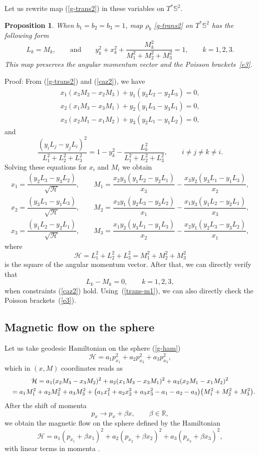 \documentclass[pdftex]{sigma}
\numberwithin{equation}{section}
\newtheorem{Proposition}[Theorem]{Proposition}
 { \theoremstyle{definition}
\newtheorem{Definition}[Theorem]{Definition}
\newtheorem{Note}[Theorem]{Note}
\newtheorem{Example}[Theorem]{Example}
\newtheorem{Remark}[Theorem]{Remark} }
\begin{document}
Let us rewrite map (\ref{g-trans2}) in these variables on $T^*\mathbb S^2$.
\begin{Proposition}
When $b_1=b_2=b_3=1$, map $\rho_b$ \eqref{g-trans2} on $T^*\mathbb S^2$ has the following form
\begin{equation}\label{e3-rho}
 L_k=M_k ,\qquad\mbox{and}\qquad y_k^2+x_k^2+\frac{M_k^2}{M_1^2+M_2^2+M_3^2}=1 ,\qquad k=1,2,3.
 \end{equation}
This map preserves the angular momentum vector and the Poisson brackets~\eqref{e3}.
\end{Proposition}
Proof: From (\ref{g-trans2}) and (\ref{caz2}), we have
\begin{gather*}
x_1(x_3M_2 - x_2 M_3) + y_1(y_3L_2 -y_2 L_3)=0 ,\\
x_2(x_1M_3 -x_3 M_1) + y_2(y_1L_3-y_3L_1) =0 ,\\
x_3(x_2 M_1 -x_1 M_2) + y_3(y_2L_1 -y_1 L_2) =0 ,
\end{gather*}
and
\[
\frac{(y_iL_j-y_jL_i)^2}{L_1^2+L_2^2+L_3^2}=1-y_k^2-\frac{L_k^2}{L_1^2+L_2^2+L_3^2} ,\qquad i\neq j\neq k\neq i .
\]
Solving these equations for $x_i$ and $M_i$ we obtain
\begin{gather}
 x_1=\dfrac{(y_2L_3-y_3L_2)}{\sqrt{\mathcal H}} ,\qquad
M_1=\dfrac{x_2y_3(y_1L_2 -y_2 L_1)}{x_3} -\dfrac{ x_3y_2(y_3L_1 -y_1 L_3)}{x_2} ,\nonumber\\
x_2=\dfrac{(y_3L_1-y_1L_3)}{\sqrt{\mathcal H}} ,\qquad
M_2=\dfrac{ x_3y_1(y_2L_3 - y_3L_2)}{x_1}-\dfrac{x_1y_3(y_1L_2-y_2L_1)}{x_3} ,\nonumber\\
x_3=\dfrac{(y_1L_2-y_2L_1)}{\sqrt{\mathcal H}} ,\qquad
M_3=\dfrac{x_1y_2(y_3L_1 -y_1L_3)}{x_2}-\dfrac{x_2y_1(y_2L_3 -y_3L_2)}{x_1},\label{trans-m1}
\end{gather}
where
\[\mathcal H=L_1^2+L_2^2+L_3^2=M_1^2+M_2^2+M_3^2\]
is the square of the angular momentum vector. After that, we can directly verify that
\[
L_k-M_k=0 ,\qquad k=1,2,3,
\]
when constraints (\ref{caz2}) hold. Using~(\ref{trans-m1}), we can also directly check the Poisson brackets~(\ref{e3}).

\subsection{Magnetic flow on the sphere}
Let us take geodesic Hamiltonian on the sphere (\ref{g-ham})
\[
\mathcal H=a_1p_{x_1}^2+a_2p_{x_2}^2+a_3p_{x_3}^2 ,
\]
which in $(x,M)$ coordinates reads as
\begin{gather*}
\mathcal H= a_1(x_2M_3-x_3M_2)^2 +a_2(x_1M_3-x_3M_1)^2 + a_3(x_2M_1 - x_1M_2)^2  \\
\hphantom{\mathcal H}{} = a_1M_1^2 + a_2M_2^2 + a_3M_3^2 + \big(a_1x_1^2 + a_2x_2^2 + a_3x_3^2 - a_1 -a_2 - a_3\big)\big(M_1^2 + M_2^2 + M_3^2\big) .
\end{gather*}
After the shift of momenta
\[p_x\to p_x+\beta x ,\qquad \beta\in\mathbb R ,\]
we obtain the magnetic flow on the sphere defined by the Hamiltonian
\begin{equation}\label{c-ham2b}
\mathcal H=a_1(p_{x_1}+\beta x_1)^2+a_2(p_{x_2}+\beta x_2)^2+a_3(p_{x_3}+\beta x_3)^2,
\end{equation}
with linear terms in momenta \cite{bm,dor,win00}.
\end{document}
